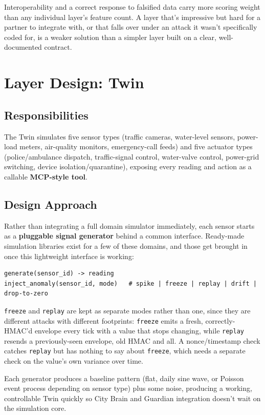 \documentclass[10pt,letterpaper]{article}
\begin{document}
Interoperability and a correct response to falsified data carry more scoring weight than any individual layer's feature count. A layer that's impressive but hard for a partner to integrate with, or that falls over under an attack it wasn't specifically coded for, is a weaker solution than a simpler layer built on a clear, well-documented contract.

\section{Layer Design: Twin}

\subsection{Responsibilities}

The Twin simulates five sensor types (traffic cameras, water-level sensors, power-load meters, air-quality monitors, emergency-call feeds) and five actuator types (police/ambulance dispatch, traffic-signal control, water-valve control, power-grid switching, device isolation/quarantine), exposing every reading and action as a callable \textbf{MCP-style tool}.

\subsection{Design Approach}

Rather than integrating a full domain simulator immediately, each sensor starts as a \textbf{pluggable signal generator} behind a common interface. Ready-made simulation libraries exist for a few of these domains, and those get brought in once this lightweight interface is working:

\begin{verbatim}
generate(sensor_id) -> reading
inject_anomaly(sensor_id, mode)   # spike | freeze | replay | drift | drop-to-zero
\end{verbatim}

\texttt{freeze} and \texttt{replay} are kept as separate modes rather than one, since they are different attacks with different footprints: \texttt{freeze} emits a fresh, correctly-HMAC'd envelope every tick with a value that stops changing, while \texttt{replay} resends a previously-seen envelope, old HMAC and all. A nonce/timestamp check catches \texttt{replay} but has nothing to say about \texttt{freeze}, which needs a separate check on the value's own variance over time.

Each generator produces a baseline pattern (flat, daily sine wave, or Poisson event process depending on sensor type) plus some noise, producing a working, controllable Twin quickly so City Brain and Guardian integration doesn't wait on the simulation core.
\end{document}
